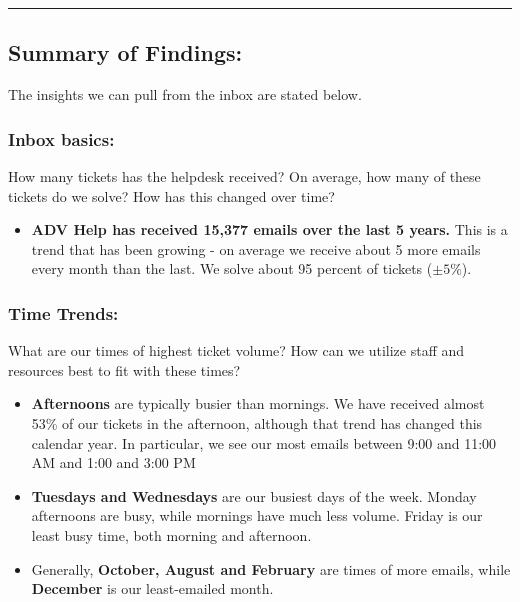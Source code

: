 \documentclass[11pt]{article}
\providecommand{\tightlist}{%
      \setlength{\itemsep}{0pt}\setlength{\parskip}{0pt}}
\begin{document}
    \begin{center}\rule{0.5\linewidth}{\linethickness}\end{center}

\hypertarget{summary-of-findings}{%
\subsection{Summary of Findings:}\label{summary-of-findings}}

The insights we can pull from the inbox are stated below.

\hypertarget{inbox-basics}{%
\subsubsection{Inbox basics:}\label{inbox-basics}}

How many tickets has the helpdesk received? On average, how many of these
tickets do we solve? How has this changed over time?

\begin{itemize}
\tightlist
\item
  \textbf{ADV Help has received 15,377 emails over the last 5 years.}
  This is a trend that has been growing - on average we receive about 5
  more emails every month than the last. We solve about 95 percent of
  tickets (\(\pm5 \%\)).
\end{itemize}

\hypertarget{time-trends}{%
\subsubsection{Time Trends:}\label{time-trends}}

What are our times of highest ticket volume? How can we utilize staff
and resources best to fit with these times?

\begin{itemize}
\item
  \textbf{Afternoons} are typically busier than mornings. We have
  received almost 53\% of our tickets in the afternoon, although that
  trend has changed this calendar year. In particular, we see our most
  emails between 9:00 and 11:00 AM and 1:00 and 3:00 PM 
\item
  \textbf{Tuesdays and Wednesdays} are our busiest days of the week.
  Monday afternoons are busy, while mornings have much less volume.
  Friday is our least busy time, both morning and afternoon. 
\item
  Generally, \textbf{October, August and February} are times of more
  emails, while \textbf{December} is our least-emailed month.
\end{itemize}
\end{document}
